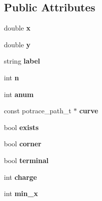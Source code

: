 \subsection*{Public Attributes}
\begin{DoxyCompactItemize}
\item 
\hypertarget{structatom__s_a0906f7ba5b21518d6306d5ffaa3ff9a1}{double {\bfseries x}}\label{structatom__s_a0906f7ba5b21518d6306d5ffaa3ff9a1}

\item 
\hypertarget{structatom__s_a8193116c60ceb4aa39d44a44145cdf75}{double {\bfseries y}}\label{structatom__s_a8193116c60ceb4aa39d44a44145cdf75}

\item 
\hypertarget{structatom__s_aedd6b4aed7cb45234a88097eb271ab13}{string {\bfseries label}}\label{structatom__s_aedd6b4aed7cb45234a88097eb271ab13}

\item 
\hypertarget{structatom__s_ac8c20622b1a9148ea98eca5dba137320}{int {\bfseries n}}\label{structatom__s_ac8c20622b1a9148ea98eca5dba137320}

\item 
\hypertarget{structatom__s_a21c8b2c655b6d520c4cf4ce089eb825e}{int {\bfseries anum}}\label{structatom__s_a21c8b2c655b6d520c4cf4ce089eb825e}

\item 
\hypertarget{structatom__s_a0072073cf6a047e07e5ea9bbb89f40fa}{const potrace\-\_\-path\-\_\-t $\ast$ {\bfseries curve}}\label{structatom__s_a0072073cf6a047e07e5ea9bbb89f40fa}

\item 
\hypertarget{structatom__s_ac72b020e77f7bcdc417d14e0816f289e}{bool {\bfseries exists}}\label{structatom__s_ac72b020e77f7bcdc417d14e0816f289e}

\item 
\hypertarget{structatom__s_af0f3f9f875eecf43e22b253a1c02260a}{bool {\bfseries corner}}\label{structatom__s_af0f3f9f875eecf43e22b253a1c02260a}

\item 
\hypertarget{structatom__s_a04819418c74ed97708a5d999f6346d21}{bool {\bfseries terminal}}\label{structatom__s_a04819418c74ed97708a5d999f6346d21}

\item 
\hypertarget{structatom__s_a622b8cefa27685b37aef6fd1ad27c19d}{int {\bfseries charge}}\label{structatom__s_a622b8cefa27685b37aef6fd1ad27c19d}

\item 
\hypertarget{structatom__s_a6224015fa4bda1cb0ab4be9fe45d6f7d}{int {\bfseries min\-\_\-x}}\label{structatom__s_a6224015fa4bda1cb0ab4be9fe45d6f7d}


\end{DoxyCompactItemize}
